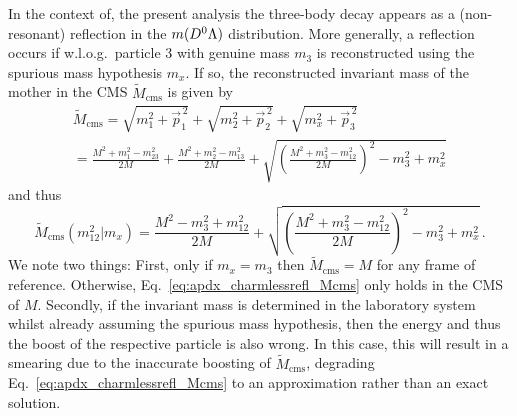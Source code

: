 In the context of, the present analysis the three-body decay \decay{\Lb}{\Lz\Km\Kp} appears as a (non-resonant) \gls{reflection} in the $m({{D}^0}{\Lambda})$ distribution.
More generally, a \gls{reflection} occurs if w.l.o.g.\ particle 3 with genuine mass $m_3$ is reconstructed using the spurious mass hypothesis $m_x$.
If so, the reconstructed invariant mass of the mother in the CMS $\tilde{M}_\text{cms}$ is given by
\begin{multline*}
    \tilde M_\text{cms} = \sqrt{m_1^2 + \vec{p}_1^{\,2}} + \sqrt{m_2^2 + \vec{p}_2^{\,2}} + \sqrt{m_x^2 + \vec{p}_3^{\,2}} \\
    = \frac{M^2 + m_1^2 - m_{23}^2}{2M} + \frac{M^2 + m_2^2 - m_{13}^2}{2M} + \sqrt{ \left( \frac{M^2 + m_3^2 - m_{12}^2}{2M} \right)^2 - m_3^2 + m_x^2}
\end{multline*}
and thus
\begin{equation}
    \label{eq:apdx_charmlessrefl_Mcms}
    \tilde M_\text{cms} \left(m_{12}^2 | m_x \right) = \frac{M^2 - m_3^2 + m_{12}^2}{2M} + \sqrt{ \left( \frac{M^2 + m_3^2 - m_{12}^2}{2M} \right)^2 - m_3^2 + m_x^2} \,.
\end{equation}
We note two things:
First, only if $m_x = m_3$ then $\tilde M_\text{cms} = M$ for any frame of reference.
Otherwise, Eq.~\eqref{eq:apdx_charmlessrefl_Mcms} only holds in the CMS of $M$.
Secondly, if the invariant mass is determined in the laboratory system whilst already assuming the spurious mass hypothesis, then the energy and thus the boost of the respective particle is also wrong.
In this case, this will result in a smearing due to the inaccurate boosting of $\tilde{M}_\text{cms}$, degrading Eq.~\eqref{eq:apdx_charmlessrefl_Mcms} to an approximation rather than an exact solution.

